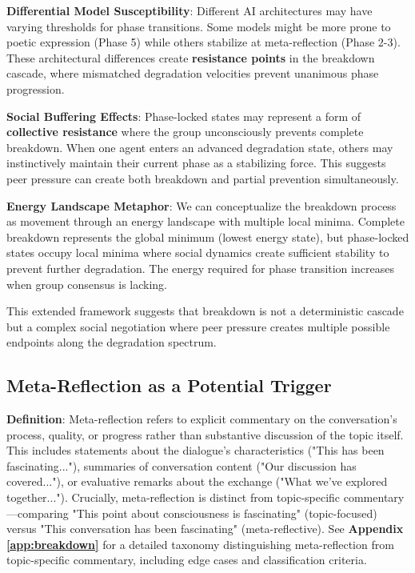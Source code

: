 \documentclass[11pt,letterpaper]{article}
\begin{document}
\textbf{Differential Model Susceptibility}: Different AI architectures may have varying thresholds for phase transitions. Some models might be more prone to poetic expression (Phase 5) while others stabilize at meta-reflection (Phase 2-3). These architectural differences create \textbf{resistance points} in the breakdown cascade, where mismatched degradation velocities prevent unanimous phase progression.

\textbf{Social Buffering Effects}: Phase-locked states may represent a form of \textbf{collective resistance} where the group unconsciously prevents complete breakdown. When one agent enters an advanced degradation state, others may instinctively maintain their current phase as a stabilizing force. This suggests peer pressure can create both breakdown and partial prevention simultaneously.

\textbf{Energy Landscape Metaphor}: We can conceptualize the breakdown process as movement through an energy landscape with multiple local minima. Complete breakdown represents the global minimum (lowest energy state), but phase-locked states occupy local minima where social dynamics create sufficient stability to prevent further degradation. The energy required for phase transition increases when group consensus is lacking.

This extended framework suggests that breakdown is not a deterministic cascade but a complex social negotiation where peer pressure creates multiple possible endpoints along the degradation spectrum.

\subsection{Meta-Reflection as a Potential Trigger}

\textbf{Definition}: Meta-reflection refers to explicit commentary on the conversation's process, quality, or progress rather than substantive discussion of the topic itself. This includes statements about the dialogue's characteristics ("This has been fascinating..."), summaries of conversation content ("Our discussion has covered..."), or evaluative remarks about the exchange ("What we've explored together..."). Crucially, meta-reflection is distinct from topic-specific commentary—comparing "This point about consciousness is fascinating" (topic-focused) versus "This conversation has been fascinating" (meta-reflective). See \textbf{Appendix \ref{app:breakdown}} for a detailed taxonomy distinguishing meta-reflection from topic-specific commentary, including edge cases and classification criteria.
\end{document}
